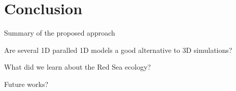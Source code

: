 \section{Conclusion}

Summary of the proposed approach

Are several 1D paralled 1D models a good alternative to 3D simulations?

What did we learn about the Red Sea ecology?

Future works?
